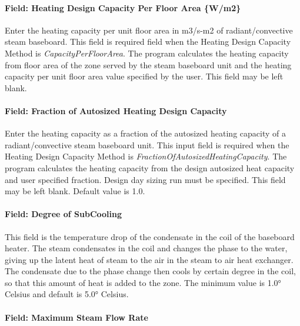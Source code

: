 \paragraph{Field: Heating Design Capacity Per Floor Area \{W/m2\}}\label{field-heating-design-capacity-per-floor-area-wm2-1-000}

Enter the heating capacity per unit floor area in m3/s-m2 of radiant/convective steam baseboard. This field is required field when the Heating Design Capacity Method is \emph{CapacityPerFloorArea}. The program calculates the heating capacity from floor area of the zone served by the steam baseboard unit and the heating capacity per unit floor area value specified by the user. This field may be left blank.

\paragraph{Field: Fraction of Autosized Heating Design Capacity}\label{field-fraction-of-autosized-heating-design-capacity-1-000}

Enter the heating capacity as a fraction of the autosized heating capacity of a radiant/convective steam baseboard unit. This input field is required when the Heating Design Capacity Method is \emph{FractionOfAutosizedHeatingCapacity}. The program calculates the heating capacity from the design autosized heat capacity and user specified fraction. Design day sizing run must be specified. This field may be left blank. Default value is 1.0.

\paragraph{Field: Degree of SubCooling}\label{field-degree-of-subcooling-000}

This field is the temperature drop of the condensate in the coil of the baseboard heater. The steam condensates in the coil and changes the phase to the water, giving up the latent heat of steam to the air in the steam to air heat exchanger. The condensate due to the phase change then cools by certain degree in the coil, so that this amount of heat is added to the zone. The minimum value is 1.0° Celsius and default is 5.0° Celsius.

\paragraph{Field: Maximum Steam Flow Rate}\label{field-maximum-steam-flow-rate-000}


